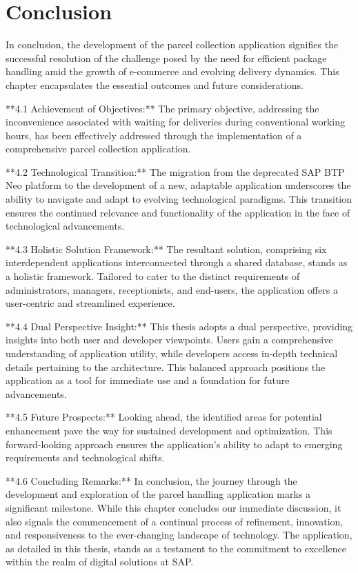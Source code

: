 \chapter*{Conclusion}
\label{ch:sum}

In conclusion, the development of the parcel collection application signifies the successful resolution of the challenge posed by the need for efficient package handling amid the growth of e-commerce and evolving delivery dynamics. This chapter encapsulates the essential outcomes and future considerations.

**4.1 Achievement of Objectives:**
The primary objective, addressing the inconvenience associated with waiting for deliveries during conventional working hours, has been effectively addressed through the implementation of a comprehensive parcel collection application. 

**4.2 Technological Transition:**
The migration from the deprecated SAP BTP Neo platform to the development of a new, adaptable application underscores the ability to navigate and adapt to evolving technological paradigms. This transition ensures the continued relevance and functionality of the application in the face of technological advancements.

**4.3 Holistic Solution Framework:**
The resultant solution, comprising six interdependent applications interconnected through a shared database, stands as a holistic framework. Tailored to cater to the distinct requirements of administrators, managers, receptionists, and end-users, the application offers a user-centric and streamlined experience.

**4.4 Dual Perspective Insight:**
This thesis adopts a dual perspective, providing insights into both user and developer viewpoints. Users gain a comprehensive understanding of application utility, while developers access in-depth technical details pertaining to the architecture. This balanced approach positions the application as a tool for immediate use and a foundation for future advancements.

**4.5 Future Prospects:**
Looking ahead, the identified areas for potential enhancement pave the way for sustained development and optimization. This forward-looking approach ensures the application's ability to adapt to emerging requirements and technological shifts.

**4.6 Concluding Remarks:**
In conclusion, the journey through the development and exploration of the parcel handling application marks a significant milestone. While this chapter concludes our immediate discussion, it also signals the commencement of a continual process of refinement, innovation, and responsiveness to the ever-changing landscape of technology. The application, as detailed in this thesis, stands as a testament to the commitment to excellence within the realm of digital solutions at SAP.